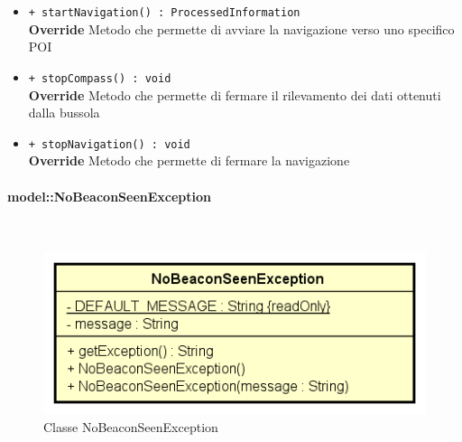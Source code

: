 \documentclass[../DefinizioneDiProdotto.tex]{subfiles}
\begin{document}
\begin{description}
\begin{itemize}
		\item \texttt{+ startNavigation() : ProcessedInformation}\\
		\textbf{Override} Metodo che permette di avviare la navigazione verso uno specifico POI
		\item \texttt{+ stopCompass() : void}\\
		\textbf{Override} Metodo che permette di fermare il rilevamento dei dati ottenuti dalla bussola
		\item \texttt{+ stopNavigation() : void}\\
		\textbf{Override} Metodo che permette di fermare la navigazione
	\end{itemize}
\end{description}

\paragraph{model::NoBeaconSeenException}
\
\begin{figure}[H]
	\centering
	\includegraphics[width=\maxwidth]{img/NoBeaconSeenException.png}
	\caption{Classe NoBeaconSeenException}\label{fig:model::NoBeaconSeenException} 
\end{figure}
\end{document}
